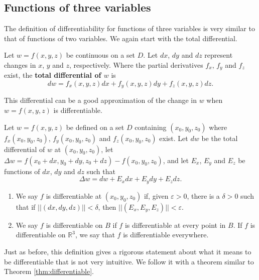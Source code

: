 \ifcalculus
\subsection{Functions of three variables}


The definition of differentiability for functions of three variables is very similar to that of functions of two variables. We again start with the total differential.

\begin{definition}\label{def:total_differential3}
Let $w=f(x,y,z)$ be continuous on a set $D$. Let $dx$, $dy$ and $dz$ represent changes in $x$, $y$ and  $z$, respectively. Where the partial derivatives $f_x$, $f_y$ and $f_z$ exist, the \textbf{total differential of $w$} is
$$dw = f_x(x,y,z)dx + f_y(x,y,z)dy+f_z(x,y,z)dz.$$
\end{definition}

This differential can be a good approximation of the change in $w$ when $w = f(x,y,z)$ is differentiable.

\begin{definition}\label{def:multi_differentiability3}
Let $w=f(x,y,z)$ be defined on a set $D$ containing $(x_0,y_0,z_0)$ where $f_x(x_0,y_0,z_0)$, $f_y(x_0,y_0,z_0)$ and $f_z(x_0,y_0,z_0)$ exist. Let $dw$ be the total differential of $w$ at $(x_0,y_0,z_0)$, let $\Delta w = f(x_0+dx,y_0+dy,z_0+dz) - f(x_0,y_0,z_0)$, and let $E_x$, $E_y$ and $E_z$ be functions of $dx$, $dy$ and $dz$  such that
$$\Delta w = dw + E_xdx + E_ydy + E_zdz.$$
\begin{enumerate}
	\item We say $f$ is differentiable at $(x_0,y_0,z_0)$ if, given $\varepsilon >0$, there is a $\delta >0$ such that if $||\left(dx,dy,dz\right)|| < \delta$, then $||\left(E_x,E_y,E_z\right)|| < \varepsilon$. 
	\item	We say $f$ is differentiable on $B$ if $f$ is differentiable at every point in $B$. If $f$ is differentiable on $\mathbb{R}^3$, we say that $f$ is differentiable everywhere.
\end{enumerate}
\end{definition}

Just as before, this definition gives a rigorous statement about what it means to be differentiable that is not very intuitive. We follow it with a theorem similar to Theorem \ref{thm:differentiable}.

